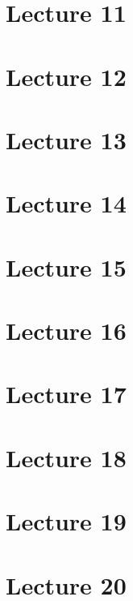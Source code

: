 \documentclass[11pt]{report}
\begin{document}
\chapter{Lecture 11}


\chapter{Lecture 12}


\chapter{Lecture 13}


\chapter{Lecture 14}


\chapter{Lecture 15}


\chapter{Lecture 16}


\chapter{Lecture 17}


\chapter{Lecture 18}


\chapter{Lecture 19}


\chapter{Lecture 20}

\end{document}
